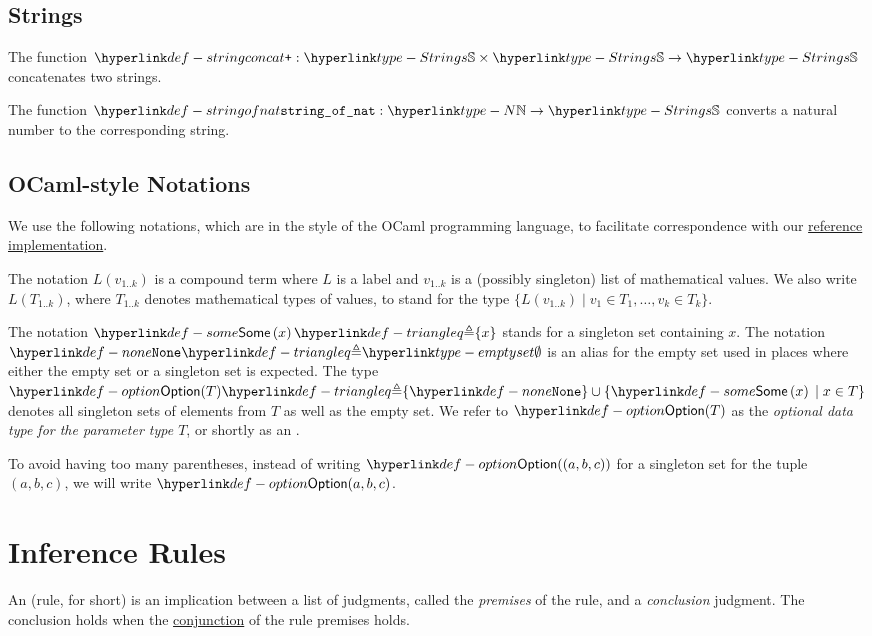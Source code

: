 \subsection{Strings}
\hypertarget{def-stringconcat}{}
The function $\stringconcat : \Strings \times \Strings \rightarrow \Strings$
concatenates two strings.

\hypertarget{def-stringofnat}{}
The function $\stringofnat : \N \rightarrow \Strings$ converts a natural number
to the corresponding string.

\subsection{OCaml-style Notations}
We use the following notations, which are in the style of the OCaml programming language,
to facilitate correspondence with our
\href{https://github.com/herd/herdtools7/tree/master/asllib}{reference implementation}.

The notation $L(v_{1..k})$ is a compound term where $L$ is a label and $v_{1..k}$ is a (possibly singleton) list of mathematical values.
We also write $L(T_{1..k})$, where $T_{1..k}$ denotes mathematical types of values, to stand for the type
$\{ L(v_{1..k}) \;|\; v_1\in T_1,\ldots,v_k\in T_k \}$.

\hypertarget{def-optional}{}
\begin{definition}
\hypertarget{def-none}{}
\hypertarget{def-some}{}
The notation $\some{x} \triangleq \{x\}$ stands for a singleton
set containing $x$.
%
The notation $\None \triangleq \emptyset$ is an alias for the empty
set used in places where either the empty set or a singleton set is expected.
%
The type $\Option(T) \triangleq \{ \None \} \cup \{ \some{x} \;|\; x\in T\}$ denotes
all singleton sets of elements from $T$ as well as the empty set.
%
We refer to $\Option(T)$ as the \emph{optional data type for the parameter
type $T$}, or shortly as an \emph{\optionalterm}.

To avoid having too many parentheses, instead of writing $\Option((a, b, c))$
for a singleton set for the tuple $(a, b, c)$, we will write $\Option(a, b, c)$.
\end{definition}

\section{Inference Rules\label{sec:Inference Rules}}
\hypertarget{def-inferencerule}{}
An \emph{\inferencerule} (rule, for short) is an implication between a list of judgments,
called the \emph{premises} of the rule,
and a \emph{conclusion} judgment.
The conclusion holds when the \underline{conjunction} of the rule premises holds.

